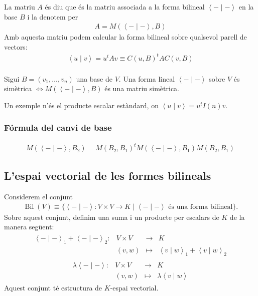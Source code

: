 La matriu $A$ és diu que és la matriu associada a la forma bilineal $\left< - \mid - \right>$ en la base $B$ i la denotem per
\begin{align}
    A = M(\left< - \mid - \right>, B)
\end{align}
Amb aquesta matriu podem calcular la forma bilineal sobre qualsevol parell de vectors:
\begin{align}
    \left< u \mid v \right> = u^{t} A v \equiv C(u, B)^{t} A C(v, B)
\end{align}
\\
Sigui $B = (v_{1}, \dots , v_{n})$ una base de $V$. Una forma lineal $\left< - \mid - \right>$ sobre $V$ és simètrica $\Leftrightarrow M(\left< - \mid - \right>, B)$ és una matriu simètrica.

Un exemple n'és el producte escalar estàndard, on $\left< u \mid v \right> = u^{t} I(n) v$.

\subsubsection*{Fórmula del canvi de base}
\begin{align}
    M(\left< - \mid - \right>, B_{2}) = M(B_{2}, B_{1})^{t} M(\left< - \mid - \right>, B_{1}) M(B_{2}, B_{1})
\end{align}
\subsection{L'espai vectorial de les formes bilineals}
Considerem el conjunt
\begin{align}
    \operatorname{Bil} (V) \equiv \{ \left< - \mid - \right>: V \times V \to K \mid \left< - \mid - \right> \text{ és una forma bilineal} \}.
\end{align}
Sobre aquest conjunt, definim una suma i un producte per escalars de $K$ de la manera següent:
\begin{align}
    \begin{matrix} 
        \left< - \mid - \right>_{1} + \left< - \mid - \right>_{2}: & V \times V & \to & K \\
        & (v, w) & \mapsto & \left< v \mid w \right>_{1} + \left< v \mid w \right>_{2}
    \end{matrix}
\end{align}
\begin{align}
    \begin{matrix} 
        \lambda \left< - \mid - \right>: & V \times V & \to & K \\
        & (v, w) & \mapsto & \lambda \left< v \mid w \right>
    \end{matrix}
\end{align}
Aquest conjunt té estructura de $K$-espai vectorial.

